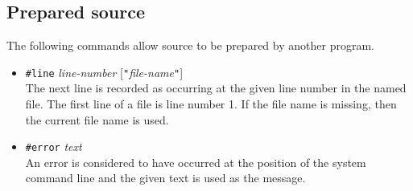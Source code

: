 \subsection{Prepared source}%
The following commands allow source to be prepared by another program.
\begin{itemize}
\item
\verb'#line'      {\it line-number\/} [\verb'"'{\it file-name\/}\verb'"']
\\
The next line is recorded as occurring at the given line number
in the named file.  The first line of a file is line number 1.
If the file name is missing, then the current file name is used.
%
\item
\verb'#error' {\it text\/}
\\
An error is considered to have occurred at the position of the system
command line and the given text is used as the message.
\end{itemize}
%
